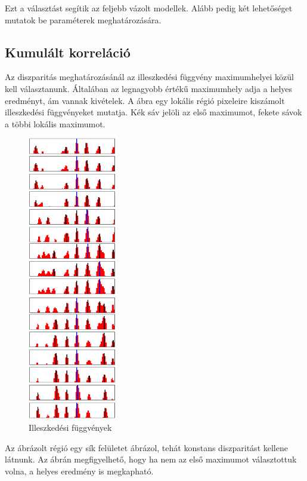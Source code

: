 Ezt a választást segítik az feljebb vázolt modellek.
Alább pedig két lehetőséget mutatok be paraméterek meghatározására.

\subsection{Kumulált korreláció}\label{sect:CumCorr}

Az diszparitás meghatározásánál az illeszkedési függvény maximumhelyei közül kell választanunk.
Általában az legnagyobb értékű maximumhely adja a helyes eredményt, ám vannak kivételek.
A  ábra egy lokális régió pixeleire kiszámolt illeszkedési függvényeket mutatja.
Kék sáv jelöli az első maximumot, fekete sávok a többi lokális maximumot. 
\begin{figure}
	\centering
	\includegraphics[width=0.35\textwidth]{figures/matchresult.png}
	\caption{Illeszkedési függvények}
	\label{fig:matchResult}
\end{figure}
Az ábrázolt régió egy sík felületet ábrázol, tehát konstans diszparitást kellene látnunk.
Az ábrán megfigyelhető, hogy ha nem az első maximumot választottuk volna, a helyes eredmény is megkapható.

